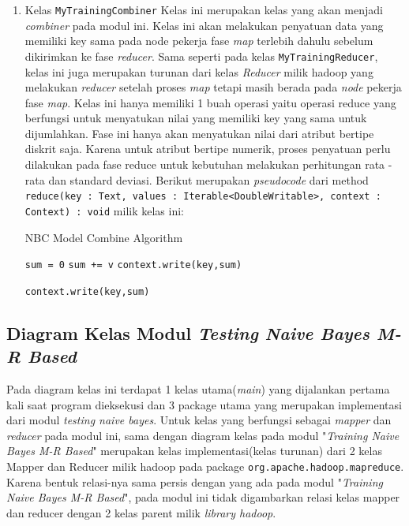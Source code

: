 \begin{enumerate}
\item Kelas \texttt{MyTrainingCombiner}
Kelas ini merupakan kelas yang akan menjadi \textit{combiner} pada modul ini. Kelas ini akan melakukan penyatuan data yang memiliki key sama pada node pekerja fase \textit{map} terlebih dahulu sebelum dikirimkan ke fase \textit{reducer}. Sama seperti pada kelas \texttt{MyTrainingReducer}, kelas ini juga merupakan turunan dari kelas \textit{Reducer} milik hadoop yang melakukan \textit{reducer} setelah proses \textit{map} tetapi masih berada pada \textit{node} pekerja fase \textit{map}. Kelas ini hanya memiliki 1 buah operasi yaitu operasi reduce yang berfungsi untuk menyatukan nilai yang memiliki key yang sama untuk dijumlahkan. Fase ini hanya akan menyatukan nilai dari atribut bertipe diskrit saja. Karena untuk atribut bertipe numerik, proses penyatuan perlu dilakukan pada fase reduce untuk kebutuhan melakukan perhitungan rata - rata dan standard deviasi. Berikut merupakan \textit{pseudocode} dari method \texttt{reduce(key : Text, values : Iterable<DoubleWritable>, context : Context) : void} milik kelas ini:

\begin{algorithm}[H]
\caption{NBC Model Combine Algorithm}\label{alg:NBCGenCombine}
\begin{algorithmic}[1]

	\State \texttt{sum = 0}
		\State \texttt{sum += v}
	\EndFor
	\State \texttt{context.write(key,sum)}
	
		\State \texttt{context.write(key,sum)}
	\EndFor
\EndIf

\EndProcedure
\end{algorithmic}
\end{algorithm}


\end{enumerate}

\subsection{Diagram Kelas Modul \textit{Testing Naive Bayes M-R Based}}
Pada diagram kelas ini terdapat 1 kelas utama(\textit{main}) yang dijalankan pertama kali saat program dieksekusi dan 3 package utama yang merupakan implementasi dari modul \textit{testing naive bayes}. Untuk kelas yang berfungsi sebagai \textit{mapper} dan \textit{reducer} pada modul ini, sama dengan diagram kelas pada modul "\textit{Training Naive Bayes M-R Based}" merupakan kelas implementasi(kelas turunan) dari 2 kelas Mapper dan Reducer milik hadoop pada package \verb|org.apache.hadoop.mapreduce|. Karena bentuk relasi-nya sama persis dengan yang ada pada modul "\textit{Training Naive Bayes M-R Based}", pada modul ini tidak digambarkan relasi kelas mapper dan reducer dengan 2 kelas parent milik \textit{library hadoop}.

